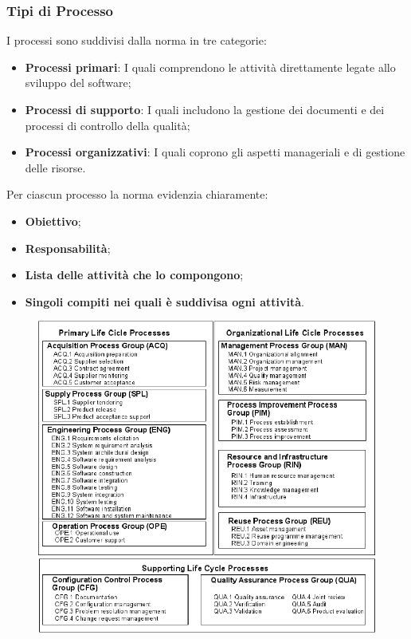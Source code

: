 \subsubsection{Tipi di Processo}
I processi sono suddivisi dalla norma in tre categorie:
\begin{itemize}
	\item \textbf{Processi primari}: I quali comprendono le attività direttamente legate allo sviluppo del software;
	\item \textbf{Processi di supporto}: I quali includono la gestione dei documenti e dei processi di controllo della qualità;
	\item \textbf{Processi organizzativi}: I quali coprono gli aspetti manageriali e di gestione delle risorse.
\end{itemize}
Per ciascun processo la norma evidenzia chiaramente:
\begin{itemize}
	\item \textbf{Obiettivo};
	\item \textbf{Responsabilità};
	\item \textbf{Lista delle attività che lo compongono};
	\item \textbf{Singoli compiti nei quali è suddivisa ogni attività}.
\end{itemize}
\begin{figure}[!ht]
	\centering
	\includegraphics[scale=0.55]{img/ISO-IEC-12207-Processes.png}
\end{figure}
\newpage
